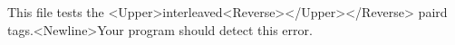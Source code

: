 This
file
tests
the
<Upper>interleaved<Reverse></Upper></Reverse>
paird tags.<Newline>Your 
program 
should 
detect 
this 
error.
